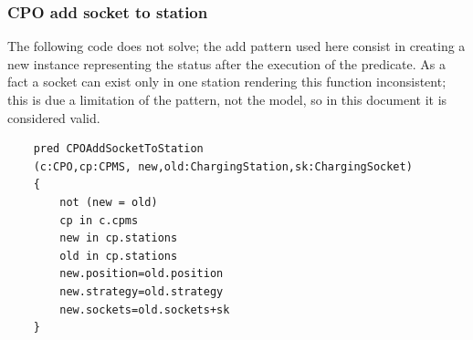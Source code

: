 \subsubsection{CPO add socket to station}
The following code does not solve; the add pattern used here consist in creating a new instance representing the status after the execution of the predicate. As a fact a socket can exist only in one station rendering this function inconsistent; this is due a limitation of the pattern, not the model, so in this document it is considered valid.

\begin{verbatim}
    pred CPOAddSocketToStation
    (c:CPO,cp:CPMS, new,old:ChargingStation,sk:ChargingSocket)
    {
        not (new = old)
        cp in c.cpms
        new in cp.stations
        old in cp.stations
        new.position=old.position
        new.strategy=old.strategy
        new.sockets=old.sockets+sk
    }  
\end{verbatim}

